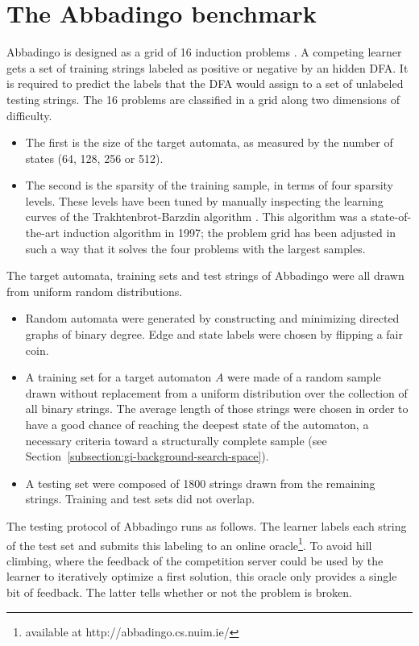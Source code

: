 \section{The Abbadingo benchmark\label{section:stamina-abbadingo}}

Abbadingo is designed as a grid of 16 induction problems \cite{Lang:1998}. A competing learner gets a set of training strings labeled as positive or negative by an hidden DFA. It is required to predict the labels that the DFA would assign to a set of unlabeled testing strings. The 16 problems are classified in a grid along two dimensions of difficulty. 
\begin{itemize}
\item The first is the size of the target automata, as measured by the number of states (64, 128, 256 or 512). 
\item The second is the sparsity of the training sample, in terms of four sparsity levels. These levels have been tuned by manually inspecting the learning curves of the Trakhtenbrot-Barzdin algorithm \cite{Trakhtenbrot:1973, Lang:1992}. This algorithm was a state-of-the-art induction algorithm in 1997; the problem grid has been adjusted in such a way that it solves the four problems with the largest samples.
\end{itemize}

The target automata, training sets and test strings of Abbadingo were all drawn from uniform random distributions.
\begin{itemize}
\item Random automata were generated by constructing and minimizing directed graphs of binary degree. Edge and state labels were chosen by flipping a fair coin. 
\item A training set for a target automaton $A$ were made of a random sample drawn without replacement from a uniform distribution over the collection of all binary strings. The average length of those strings were chosen in order to have a good chance of reaching the deepest state of the automaton, a necessary criteria toward a structurally complete sample (see Section~\ref{subsection:gi-background-search-space}). 
\item A testing set were composed of 1800 strings drawn from the remaining strings. Training and test sets did not overlap.
\end{itemize}

The testing protocol of Abbadingo runs as follows. The learner labels each string of the test set and submits this labeling to an online oracle\footnote{available at http://abbadingo.cs.nuim.ie/}. To avoid hill climbing, where the feedback of the competition server could be used by the learner to iteratively optimize a first solution, this oracle only provides a single bit of feedback. The latter tells whether or not the problem is broken. 

